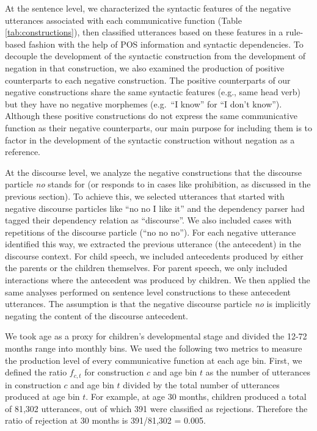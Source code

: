 \documentclass[
  man,floatsintext]{apa6}
\begin{document}
At the sentence level, we characterized the syntactic features of the negative utterances associated with each communicative function (Table \ref{tab:constructions}), then classified utterances based on these features in a rule-based fashion with the help of POS information and syntactic dependencies. To decouple the development of the syntactic construction from the development of negation in that construction, we also examined the production of positive counterparts to each negative construction. The positive counterparts of our negative constructions share the same syntactic features (e.g., same head verb) but they have no negative morphemes (e.g.~``I know'' for ``I don't know''). Although these positive constructions do not express the same communicative function as their negative counterparts, our main purpose for including them is to factor in the development of the syntactic construction without negation as a reference.

At the discourse level, we analyze the negative constructions that the discourse particle \emph{no} stands for (or responds to in cases like prohibition, as discussed in the previous section). To achieve this, we selected utterances that started with negative discourse particles like ``no no I like it'' and the dependency parser had tagged their dependency relation as ``discourse''. We also included cases with repetitions of the discourse particle (``no no no''). For each negative utterance identified this way, we extracted the previous utterance (the antecedent) in the discourse context. For child speech, we included antecedents produced by either the parents or the children themselves. For parent speech, we only included interactions where the antecedent was produced by children. We then applied the same analyses performed on sentence level constructions to these antecedent utterances. The assumption is that the negative discourse particle \emph{no} is implicitly negating the content of the discourse antecedent.

We took age as a proxy for children's developmental stage and divided the 12-72 months range into monthly bins. We used the following two metrics to measure the production level of every communicative function at each age bin. First, we defined the ratio \(f_{c,t}\) for construction \(c\) and age bin \(t\) as the number of utterances in construction \(c\) and age bin \(t\) divided by the total number of utterances produced at age bin \(t\). For example, at age 30 months, children produced a total of 81,302 utterances, out of which 391 were classified as rejections. Therefore the ratio of rejection at 30 months is 391/81,302 = 0.005.
\end{document}

